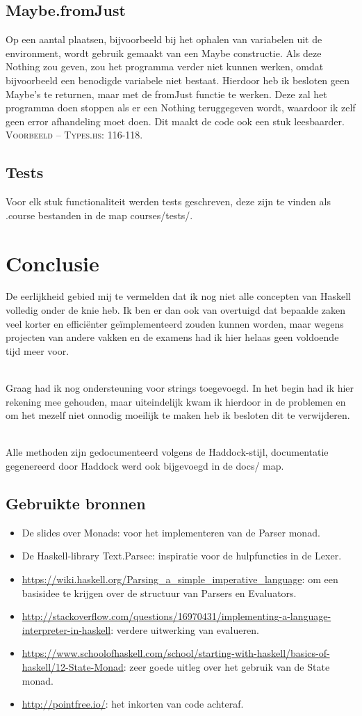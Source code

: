 \documentclass[12pt,a4paper]{report}
\begin{document}
\section{Maybe.fromJust}
Op een aantal plaatsen, bijvoorbeeld bij het ophalen van variabelen uit de environment, wordt gebruik gemaakt van een Maybe constructie. Als deze Nothing zou geven, zou het programma verder niet kunnen werken, omdat bijvoorbeeld een benodigde variabele niet bestaat. Hierdoor heb ik besloten geen Maybe’s te returnen, maar met de fromJust functie te werken. Deze zal het programma doen stoppen als er een Nothing teruggegeven wordt, waardoor ik zelf geen error afhandeling moet doen. Dit maakt de code ook een stuk leesbaarder. \textsc{Voorbeeld – Types.hs: 116-118.}
\section{Tests}
Voor elk stuk functionaliteit werden tests geschreven, deze zijn te vinden als .course bestanden in de map courses/tests/.
\chapter{Conclusie}
De eerlijkheid gebied mij te vermelden dat ik nog niet alle concepten van Haskell volledig onder de knie heb. Ik ben er dan ook van overtuigd dat bepaalde zaken veel korter en efficiënter geïmplementeerd zouden kunnen worden, maar wegens projecten van andere vakken en de examens had ik hier helaas geen voldoende tijd meer voor.\par\mbox{}\\
Graag had ik nog ondersteuning voor strings toegevoegd. In het begin had ik hier rekening mee gehouden, maar uiteindelijk kwam ik hierdoor in de problemen en om het mezelf niet onnodig moeilijk te maken heb ik besloten dit te verwijderen.\par\mbox{}\\
Alle methoden zijn gedocumenteerd volgens de Haddock-stijl, documentatie gegenereerd door Haddock werd ook bijgevoegd in de docs/ map.
\section{Gebruikte bronnen}
\begin{itemize}
  \item De slides over Monads: voor het implementeren van de Parser monad.
  \item De Haskell-library Text.Parsec: inspiratie voor de hulpfuncties in de Lexer.
  \item \url{https://wiki.haskell.org/Parsing_a_simple_imperative_language}: om een basisidee te krijgen over de structuur van Parsers en Evaluators.
  \item   \sloppy\url{http://stackoverflow.com/questions/16970431/implementing-a-language-interpreter-in-haskell}: verdere uitwerking van evalueren.
  \item \sloppy\url{https://www.schoolofhaskell.com/school/starting-with-haskell/basics-of-haskell/12-State-Monad}: zeer goede uitleg over het gebruik van de State monad.
  \item \url{http://pointfree.io/}: het inkorten van code achteraf.
\end{itemize}
\newpage
\end{document}
